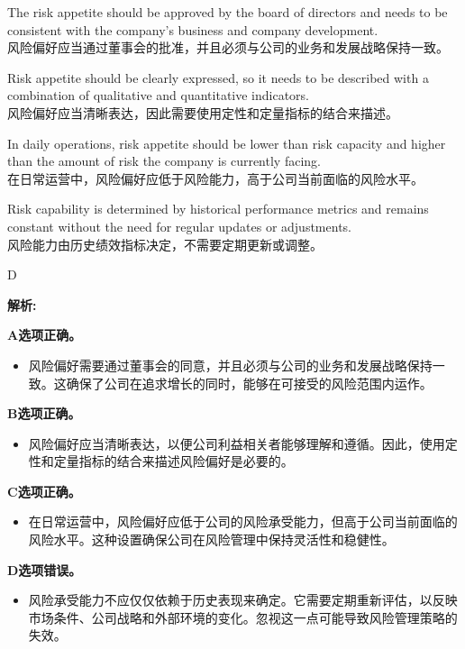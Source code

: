 \documentclass{article}
\newenvironment{explanation}
{\textbf{解析:}\par}
{\par}
\begin{document}
\begin{choices}
    \item The risk appetite should be approved by the board of directors and needs to be consistent with the company's business and company development.\\
    风险偏好应当通过董事会的批准，并且必须与公司的业务和发展战略保持一致。
    \item Risk appetite should be clearly expressed, so it needs to be described with a combination of qualitative and quantitative indicators. \\
    风险偏好应当清晰表达，因此需要使用定性和定量指标的结合来描述。
    \item In daily operations, risk appetite should be lower than risk capacity and higher than the amount of risk the company is currently facing. \\
    在日常运营中，风险偏好应低于风险能力，高于公司当前面临的风险水平。
    \item Risk capability is determined by historical performance metrics and remains constant without the need for regular updates or adjustments. \\
    风险能力由历史绩效指标决定，不需要定期更新或调整。
\end{choices}


\begin{correctanswer}
    D
\end{correctanswer}

\begin{explanation}
    \textbf{A选项正确。}
    \begin{itemize}
        \item 风险偏好需要通过董事会的同意，并且必须与公司的业务和发展战略保持一致。这确保了公司在追求增长的同时，能够在可接受的风险范围内运作。
    \end{itemize}

    \textbf{B选项正确。}
    \begin{itemize}
        \item 风险偏好应当清晰表达，以便公司利益相关者能够理解和遵循。因此，使用定性和定量指标的结合来描述风险偏好是必要的。
    \end{itemize}

    \textbf{C选项正确。}
    \begin{itemize}
        \item 在日常运营中，风险偏好应低于公司的风险承受能力，但高于公司当前面临的风险水平。这种设置确保公司在风险管理中保持灵活性和稳健性。
    \end{itemize}

    \textbf{D选项错误。}
    \begin{itemize}
        \item 风险承受能力不应仅仅依赖于历史表现来确定。它需要定期重新评估，以反映市场条件、公司战略和外部环境的变化。忽视这一点可能导致风险管理策略的失效。
    \end{itemize}
\end{explanation}
\end{document}
